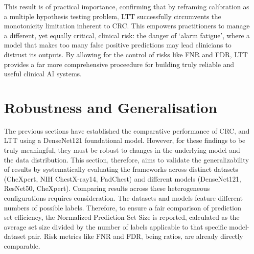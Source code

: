 This result is of practical importance, confirming that by
reframing calibration as a multiple hypothesis testing problem,
LTT successfully circumvents the monotonicity limitation inherent to CRC.
This empowers practitioners to manage a different, yet equally critical, clinical risk:
the danger of `alarm fatigue',
where a model that makes too many false positive predictions
may lead clinicians to distrust its outputs.
By allowing for the control of risks like FNR and FDR,
LTT provides a far more comprehensive proceedure
for building truly reliable and useful clinical AI systems.

\section{Robustness and Generalisation}

The previous sections have established the comparative performance of CRC,
and LTT using a DenseNet121 foundational model.
However, for these findings to be truly meaningful,
they must be robust to changes in the underlying model and the data distribution.
This section, therefore, aims to validate the generalizability of results
by systematically evaluating the frameworks across distinct datasets
(CheXpert, NIH ChestX-ray14, PadChest)
and different models (DenseNet121, ResNet50, CheXpert).
Comparing results across these heterogeneous configurations requires consideration.
The datasets and models feature different numbers of possible labels.
Therefore, to ensure a fair comparison of prediction set efficiency,
the Normalized Prediction Set Size is reported,
calculated as the average set size divided by the number of labels
applicable to that specific model-dataset pair.
Risk metrics like FNR and FDR, being ratios, are already directly comparable.

